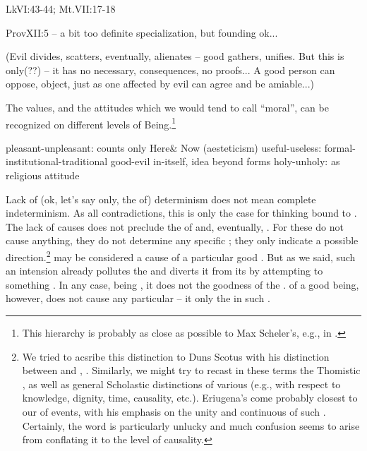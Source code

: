\kom
\citet{For a good tree bringeth not forth corrupt fruit; neither doth a 
corrupt tree bring forth good fruit.
 For every tree is known by his own fruit.}{Lk}{VI:43-44; Mt.VII:17-18}

\citet{The thoughts of the righteous are right: but the counsels of
      the wicked are deceit.}{Prov}{XII:5} 
-- a bit too definite specialization, but founding ok...


\kom
(Evil divides, scatters, eventually, alienates --  good gathers,
unifies. But this is only(??)  -- it has no necessary, 
consequences, no  proofs... A good person can oppose, object, just
as one affected by evil can agree and be amiable...)

\tsep{}


\pa
 The values, and the attitudes which 
we would tend to call ``moral'', can be recognized on different 
levels of Being.\footnote{This hierarchy is probably as close as 
possible to Max Scheler's, e.g., in \citeauthor*{MaxForm}.}

    {pleasant-unpleasant: counts only Here\& Now (aesteticism)}
    {useful-useless: formal-institutional-traditional}
    {good-evil in-itself, idea beyond forms}
    {holy-unholy: as religious attitude} 

Lack of (ok, let's say only, the  of) determinism does not
mean complete indeterminism. As all contradictions, this is only the
case for thinking bound to . The lack of
 causes does not preclude the  of
 and, eventually, . For these do not
cause anything, they do not determine any specific ; they
only indicate  a possible direction.\footnote{We tried to
  acsribe this distinction to Duns Scotus with his distinction between  and ,
  . Similarly, we might try to recast in
  these terms the Thomistic , as well as general
  Scholastic distinctions of various  (e.g.,
  with respect to knowledge, dignity, time, causality, etc.).
  Eriugena's  come probably closest to our
   of  events, with his emphasis on
  the  unity and continuous  of such
  . Certainly, the word  is particularly unlucky
  and much confusion seems to arise from conflating it to the level of
   causality.}
%
 may be considered a
cause of a particular good .  But as we said, such an
intension already pollutes the  and diverts it from its
 by attempting to  something
. In any case, being , it does not 
the goodness of the .  of a good being, however,
does not cause any particular  -- it only  the 
 in such . 


